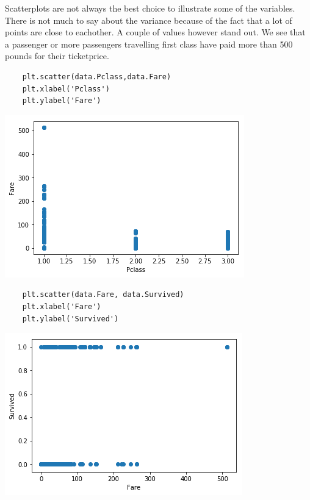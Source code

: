 \documentclass[11pt]{article}
\begin{document}
Scatterplots are not always the best choice to illustrate some of the
variables. There is not much to say about the variance because of the
fact that a lot of points are close to eachother. A couple of values
however stand out. We see that a passenger or more passengers travelling
first class have paid more than 500 pounds for their ticketprice.

\begin{verbatim}
    plt.scatter(data.Pclass,data.Fare)
    plt.xlabel('Pclass')
    plt.ylabel('Fare')
\end{verbatim}

\begin{center}
\includegraphics[width=.9\linewidth]{output_13_1.png}
\end{center}

\begin{verbatim}
    plt.scatter(data.Fare, data.Survived)
    plt.xlabel('Fare')
    plt.ylabel('Survived')
\end{verbatim}

\begin{center}
\includegraphics[width=.9\linewidth]{output_14_1.png}
\end{center}
\end{document}
